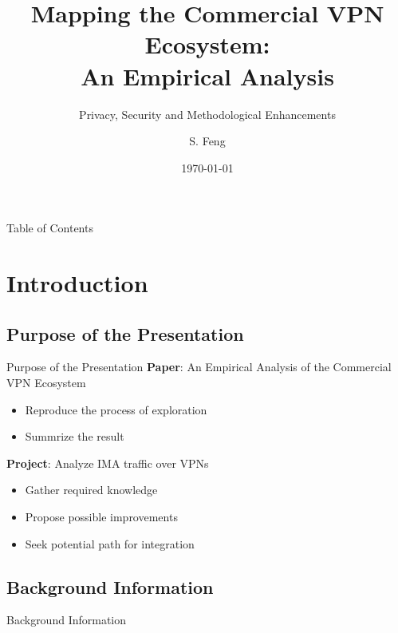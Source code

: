 \documentclass{beamer}
\title[Mapping the Commercial VPN Ecosystem]{
    Mapping the Commercial VPN Ecosystem:\\
    An Empirical Analysis
}
\subtitle[]{Privacy, Security and Methodological Enhancements}
\author[Shuo Feng]{S. Feng}
\institute[NIMS Lab]{
  NIMS Lab\\
  USRA Summer 2023}
\date{\today}
\begin{document}
\frame{\titlepage}


\begin{frame}{Table of Contents}
  \tableofcontents
\end{frame}

\section{Introduction}

\subsection{Purpose of the Presentation}

\begin{frame}{Purpose of the Presentation}
  \textbf{Paper}: An Empirical Analysis of the Commercial VPN Ecosystem
  \begin{itemize}
    \item Reproduce the process of exploration
    \item Summrize the result
  \end{itemize}

  \textbf{Project}: Analyze IMA traffic over \colorbox{DALYellow}{VPNs}
  \begin{itemize}
    \item Gather required knowledge
    \item Propose possible improvements
    \item Seek potential path for integration
  \end{itemize}
\end{frame}

\subsection{Background Information}

\begin{frame}{Background Information}
\end{frame}
\end{document}
